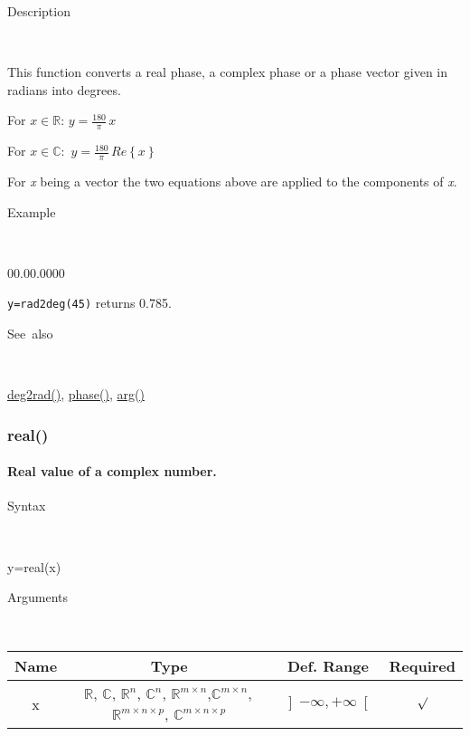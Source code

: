 \begin{description}
\item [Description]~
\end{description}
This function converts a real phase, a complex phase or a phase vector
given in radians into degrees. 

\medskip{}
For $x\in\mathbb{R}$: $y={\displaystyle \frac{180}{\pi}}\, x$

\medskip{}
For $x\mathbb{\mathbb{\in C}}:$ $y={\displaystyle \frac{180}{\pi}}\, Re\left\{ x\right\} $
\medskip{}

For \textit{x} being a vector the two equations above are
applied to the components of \textit{x}.

\begin{description}
\item [Example]~
\end{description}
\begin{lyxlist}{00.00.0000}
\item [\texttt{y=rad2deg(45)}]returns 0.785.
\end{lyxlist}
\begin{description}
\item [See~also]~
\end{description}
\textcolor{blue}{\hyperlink{deg2rad}{deg2rad()}}, \textcolor{blue}{\hyperlink{phase}{phase()}},
\textcolor{blue}{\hyperlink{arg}{arg()}}


\newpage
\subsubsection*{\hypertarget{real}{}{\Large real()}}


\paragraph{\label{par:Real}Real value of a complex number.}

\begin{description}
\item [Syntax]~
\end{description}
y=real(x)

\begin{description}
\item [Arguments]~
\end{description}
\begin{tabular}{|c|c|c|c|}
\hline 
Name&
Type&
Def. Range&
Required\tabularnewline
\hline
\hline 
x&
$\mathbb{R}$, $\mathbb{C}$, $\mathbb{R}^{n}$, $\mathbb{C}^{n}$,
$\mathbb{\mathbb{R}}^{m\times n}$,$\mathbb{\mathbb{C}}^{m\times n},$$\mathbb{\mathbb{R}}^{m\times n\times p}$,
$\mathbb{\mathbb{C}}^{m\times n\times p}$ &
$\left]-\infty,+\infty\right[$&
$\surd$\tabularnewline
\hline
\end{tabular}


